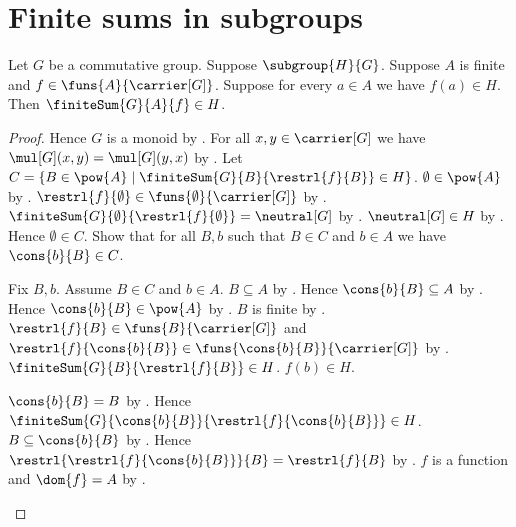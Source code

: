 


\section{Finite sums in subgroups}

\begin{theorem}\label{subgroup_contains_finite_sum}
    Let $G$ be a commutative group.
    Suppose $\subgroup{H}{G}$.
    Suppose $A$ is finite and $f\in\funs{A}{\carrier[G]}$.
    Suppose for every $a\in A$ we have $f(a)\in H$.
    Then $\finiteSum{G}{A}{f}\in H$.
\end{theorem}
\begin{proof}
    Hence $G$ is a monoid by .
    For all $x,y\in\carrier[G]$ we have $\mul[G](x,y)=\mul[G](y,x)$ by
        .
    Let $C=\{B\in\pow{A}\mid
        \finiteSum{G}{B}{\restrl{f}{B}}\in H\}$.
    $\emptyset\in\pow{A}$ by .
    $\restrl{f}{\emptyset}\in\funs{\emptyset}{\carrier[G]}$ by
        .
    $\finiteSum{G}{\emptyset}{\restrl{f}{\emptyset}}=\neutral[G]$ by
        .
    $\neutral[G]\in H$ by .
    Hence $\emptyset\in C$.
    Show that for all $B,b$ such that $B\in C$ and $b\in A$ we have
        $\cons{b}{B}\in C$.
    \begin{subproof}
        Fix $B,b$.
        Assume $B\in C$ and $b\in A$.
        $B\subseteq A$ by .
        Hence $\cons{b}{B}\subseteq A$ by .
        Hence $\cons{b}{B}\in\pow{A}$ by .
        $B$ is finite by .
        $\restrl{f}{B}\in\funs{B}{\carrier[G]}$ and
            $\restrl{f}{\cons{b}{B}}\in
                \funs{\cons{b}{B}}{\carrier[G]}$ by
            .
        $\finiteSum{G}{B}{\restrl{f}{B}}\in H$.
        $f(b)\in H$.
        \begin{byCase}
            $\cons{b}{B}=B$ by .
            Hence $\finiteSum{G}{\cons{b}{B}}{
                \restrl{f}{\cons{b}{B}}}\in H$.
            $B\subseteq\cons{b}{B}$ by .
            Hence $\restrl{\restrl{f}{\cons{b}{B}}}{B}
                =\restrl{f}{B}$ by .
            $f$ is a function and $\dom{f}=A$ by
                .

\end{byCase}
\end{subproof}
\end{proof}
